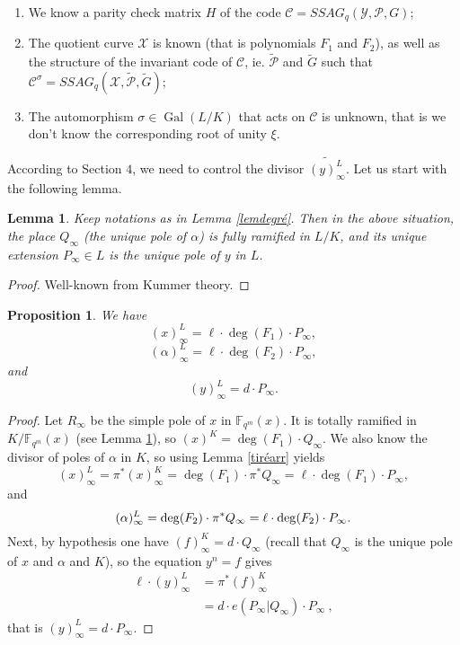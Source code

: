 \documentclass[10pt]{article}
\newtheorem{prop1}[thm]{Proposition}
\newtheorem{lem1}[thm]{Lemma}
\newcommand{\s}{\vspace{0.3cm}}
\newcommand{\cd}{\cdot}
\newcommand{\fqm}{\mathbb{F}_{q^m}}
\newcommand{\X}{\mathcal{X}}
\newcommand{\Y}{\mathcal{Y}}
\newcommand{\PR}{\mathcal{P}}
\newcommand{\Gal}{\operatorname{Gal}}
\begin{document}
\s

\begin{enumerate}
\item We know a parity check matrix $H$ of the code $\mathcal{C} = SSAG_q(\Y,\PR,G)$;
\item The quotient curve $\X$ is known (that is polynomials $F_1$ and $F_2$), as well as the structure of the invariant code of $\mathcal{C}$, ie. $\tilde{\PR}$ and $\tilde{G}$ such that $\mathcal{C}^{\sigma} = SSAG_q(\X,\tilde{\PR},\tilde{G})$;
\item The automorphism $\sigma \in\Gal(L/K)$ that acts on $\mathcal{C}$ is unknown, that is we don't know the corresponding root of unity $\xi$.
\end{enumerate}

\s


According to Section $4$, we need to control the divisor $\widetilde{(y)^L_{\infty}}$. Let us start with the following lemma.

\s

\begin{lem1} \label{ramification}
Keep notations as in Lemma \ref{lemdegré}. Then in the above situation, the place $Q_{\infty}$ (the unique pole of $\alpha$) is fully ramified in $L/K$, and its unique extension $P_{\infty} \in L$ is the unique pole of $y$ in $L$. 
\end{lem1}

\s

\begin{proof}
Well-known from Kummer theory.
\end{proof}

\s

\begin{prop1} \label{propclé}
We have
\[(x)^L_{\infty} = \ell \cd \deg(F_1) \cd P_{\infty},\]
\[(\alpha)^L_{\infty} = \ell \cd \deg(F_2) \cd P_{\infty},\]
and
\[(y)^L_{\infty} = d \cd P_{\infty}.\]
\end{prop1}

\s

\begin{proof}
Let $R_{\infty}$ be the simple pole of $x$ in $\fqm(x)$. It is totally ramified in $K/\fqm(x)$ (see Lemma \ref{ramification}), so $(x)^K = \deg(F_1) \cd Q_{\infty}$. We also know the divisor of poles of $\alpha$ in $K$, so using Lemma \ref{tiréarr} yields
\[(x)^L_{\infty} = \pi^*(x)^K_{\infty} = \deg(F_1) \cd \pi^*Q_{\infty} = \ell \cd \deg(F_1) \cd P_{\infty},\]
and
\[(\alpha)^L_{\infty} = \deg(F_{\rm 2}) \cd \pi^*Q_{\infty} = \ell \cd \deg(F_{\rm 2}) \cd P_{\infty}.\]
Next, by hypothesis one have $(f)^K_{\infty} = d \cd Q_{\infty}$ (recall that $Q_{\infty}$ is the unique pole of $x$ and $\alpha$ and $K$), so the equation $y^n=f$ gives
\begin{align*} \ell \cd (y)^L_{\infty} &= \pi^*(f)^K_{\infty} \\
&= d \cd e(P_{\infty}|Q_{\infty}) \cd P_{\infty} \ ,
\end{align*}
that is $(y)^L_{\infty} = d \cd P_{\infty}.$
\end{proof}
\end{document}
